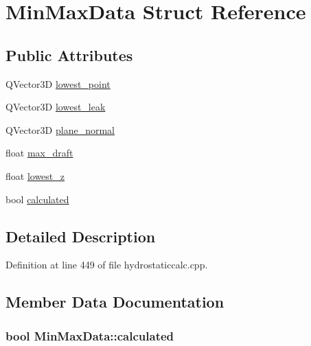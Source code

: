 \hypertarget{structMinMaxData}{}\section{Min\+Max\+Data Struct Reference}
\label{structMinMaxData}
\subsection*{Public Attributes}
\begin{DoxyCompactItemize}
\item 
Q\+Vector3D \hyperlink{structMinMaxData_a3d27ad5adf37db4728e700f914bc2ab3}{lowest\+\_\+point}
\item 
Q\+Vector3D \hyperlink{structMinMaxData_ab422a9e59c6bb2bc9a28bbb002d5b09f}{lowest\+\_\+leak}
\item 
Q\+Vector3D \hyperlink{structMinMaxData_a62b4b4d97aba034731cdb0f11b23d856}{plane\+\_\+normal}
\item 
float \hyperlink{structMinMaxData_a10cf6d95b5b6d24b6b2e874e9fb05362}{max\+\_\+draft}
\item 
float \hyperlink{structMinMaxData_abe1d706394e9836f49ef8cb5dff7bd99}{lowest\+\_\+z}
\item 
bool \hyperlink{structMinMaxData_aafb5f4af5f4cbcce8f2473b85abf511c}{calculated}
\end{DoxyCompactItemize}


\subsection{Detailed Description}


Definition at line 449 of file hydrostaticcalc.\+cpp.



\subsection{Member Data Documentation}
\subsubsection[{\texorpdfstring{calculated}{calculated}}]{\setlength{\rightskip}{0pt plus 5cm}bool Min\+Max\+Data\+::calculated}\hypertarget{structMinMaxData_aafb5f4af5f4cbcce8f2473b85abf511c}{}\label{structMinMaxData_aafb5f4af5f4cbcce8f2473b85abf511c}


